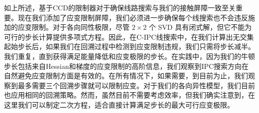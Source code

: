 如上所述，基于CCD的限制器对于确保线路搜索与我们的接触屏障一致至关重要。现在我们添加了应变限制屏障，我们必须进一步确保每个线搜索也不会违反施加的应变限制。对于各向同性极限，尽管 $2 \times 2$ 个 SVD 具有闭式解，但它不能为可行的步长计算提供多项式方程。因此，在C-IPC线搜索中，在我们计算出无交集起始步长后，如果我们在回溯过程中检测到应变限制违规，我们只需将步长减半。我们重复，直到获得满足能量降低和应变极限的步长。在实践中，因为我们的牛顿步长包括来自Hessian和梯度的应变限制的高阶信息，我们观察到IPC搜索方向在自然避免应变限制方面是有效的。在所有情况下，如果需要，到目前为止，我们观察到最多需要三个回溯步骤就可以限制应变。对于我们的各向异性模型，我们目前也应用相同的回溯策略。然而，虽然目前不需要考虑效率，但我们确实注意到，在这里我们可以制定二次方程，适合直接计算满足步长的最大可行应变极限。














